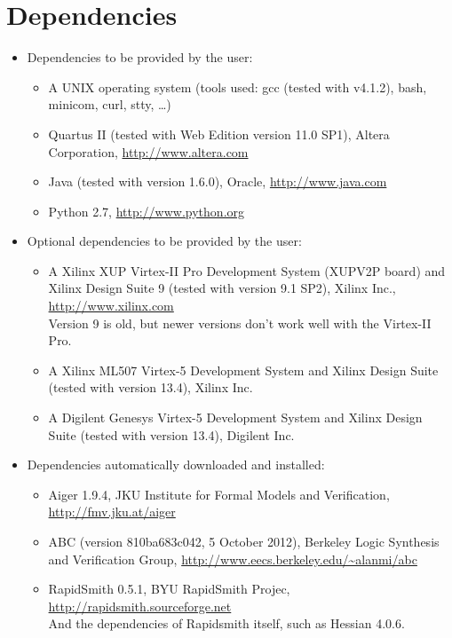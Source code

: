 \documentclass[a4paper,oneside]{memoir}
\begin{document}
\section{Dependencies}
\begin{itemize}
\item Dependencies to be provided by the user:
\begin{itemize}
\item A UNIX operating system (tools used: gcc (tested with v4.1.2), bash, minicom, curl, stty, \dots)
\item Quartus II (tested with Web Edition version 11.0 SP1), Altera Corporation, \url{http://www.altera.com}
\item Java (tested with version 1.6.0), Oracle, \url{http://www.java.com}
\item Python 2.7, \url{http://www.python.org}
\end{itemize}
\item Optional dependencies to be provided by the user:
\begin{itemize}
\item A Xilinx XUP Virtex-II Pro Development System (XUPV2P board) and Xilinx Design Suite 9 (tested with version 9.1 SP2), Xilinx Inc., \url{http://www.xilinx.com}\\ %
Version 9 is old, but newer versions don't work well with the Virtex-II Pro.
\item A Xilinx ML507 Virtex-5 Development System and Xilinx Design Suite (tested with version 13.4), Xilinx Inc.
\item A Digilent Genesys Virtex-5 Development System and Xilinx Design Suite (tested with version 13.4), Digilent Inc.
\end{itemize}
\item Dependencies automatically downloaded and installed:
\begin{itemize}
\item Aiger 1.9.4, JKU Institute for Formal Models and Verification, \url{http://fmv.jku.at/aiger}
\item ABC (version 810ba683c042, 5 October 2012), Berkeley Logic Synthesis and Verification Group, \url{http://www.eecs.berkeley.edu/\~alanmi/abc}
\item RapidSmith 0.5.1, BYU RapidSmith Projec,  \url{http://rapidsmith.sourceforge.net}\\
And the dependencies of Rapidsmith itself, such as Hessian 4.0.6.
\end{itemize}
\end{itemize}
\end{document}
